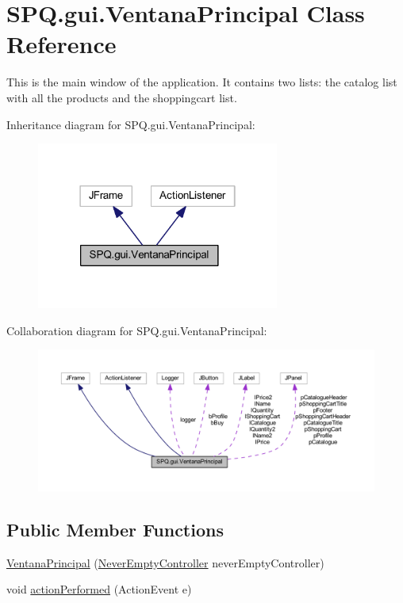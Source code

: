 \hypertarget{class_s_p_q_1_1gui_1_1_ventana_principal}{}\section{S\+P\+Q.\+gui.\+Ventana\+Principal Class Reference}
\label{class_s_p_q_1_1gui_1_1_ventana_principal}


This is the main window of the application. It contains two lists\+: the catalog list with all the products and the shoppingcart list.  




Inheritance diagram for S\+P\+Q.\+gui.\+Ventana\+Principal\+:
\nopagebreak
\begin{figure}[H]
\begin{center}
\leavevmode
\includegraphics[width=226pt]{class_s_p_q_1_1gui_1_1_ventana_principal__inherit__graph}
\end{center}
\end{figure}


Collaboration diagram for S\+P\+Q.\+gui.\+Ventana\+Principal\+:
\nopagebreak
\begin{figure}[H]
\begin{center}
\leavevmode
\includegraphics[width=350pt]{class_s_p_q_1_1gui_1_1_ventana_principal__coll__graph}
\end{center}
\end{figure}
\subsection*{Public Member Functions}
\begin{DoxyCompactItemize}
\item 
\mbox{\hyperlink{class_s_p_q_1_1gui_1_1_ventana_principal_ab35bb8c8e3a0b03050093cc3d6b58a90}{Ventana\+Principal}} (\mbox{\hyperlink{class_s_p_q_1_1controller_1_1_never_empty_controller}{Never\+Empty\+Controller}} never\+Empty\+Controller)
\item 
void \mbox{\hyperlink{class_s_p_q_1_1gui_1_1_ventana_principal_a8cb181f9dff7128cd674383688ca2c56}{action\+Performed}} (Action\+Event e)
\end{DoxyCompactItemize}
